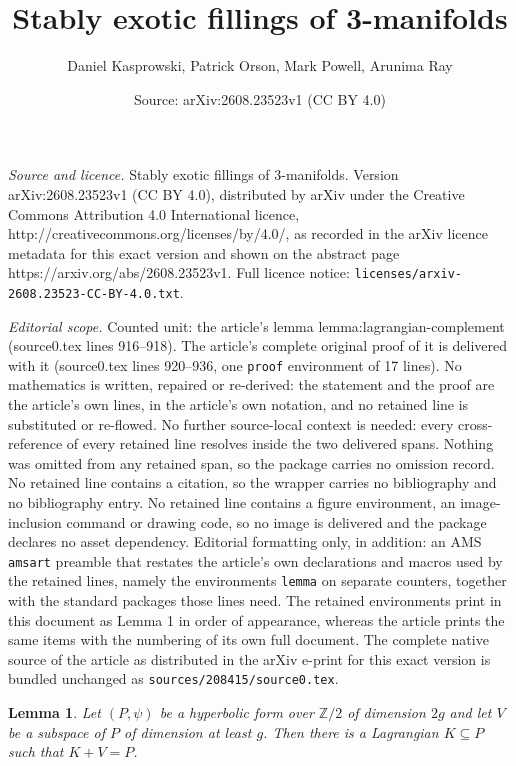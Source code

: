 \documentclass[10pt,a4paper]{amsart}
\title{Stably exotic fillings of 3-manifolds}
\author{Daniel Kasprowski, Patrick Orson, Mark Powell, Arunima Ray}
\date{Source: arXiv:2608.23523v1 (CC BY 4.0)}
\newtheorem{lemma}{Lemma}
\newcommand{\Z}{\mathbb{Z}}
\begin{document}
\maketitle

\noindent\emph{Source and licence.} Stably exotic fillings of 3-manifolds. Version arXiv:2608.23523v1 (CC BY 4.0), distributed by arXiv under the Creative Commons Attribution 4.0 International licence, http://creativecommons.org/licenses/by/4.0/, as recorded in the arXiv licence metadata for this exact version and shown on the abstract page https://arxiv.org/abs/2608.23523v1. Full licence notice: \texttt{licenses/arxiv-2608.23523-CC-BY-4.0.txt}.\par\smallskip

\noindent\textit{Editorial scope.} Counted unit: the article's lemma lemma:lagrangian-complement (source0.tex lines 916--918). The article's complete original proof of it is delivered with it (source0.tex lines 920--936, one \texttt{proof} environment of 17 lines). No mathematics is written, repaired or re-derived: the statement and the proof are the article's own lines, in the article's own notation, and no retained line is substituted or re-flowed.  No further source-local context is needed: every cross-reference of every retained line resolves inside the two delivered spans.  Nothing was omitted from any retained span, so the package carries no omission record.  No retained line contains a citation, so the wrapper carries no bibliography and no bibliography entry.  No retained line contains a figure environment, an image-inclusion command or drawing code, so no image is delivered and the package declares no asset dependency.  Editorial formatting only, in addition: an AMS \texttt{amsart} preamble that restates the article's own declarations and macros used by the retained lines, namely the environments \texttt{lemma} on separate counters, together with the standard packages those lines need.  The retained environments print in this document as Lemma 1 in order of appearance, whereas the article prints the same items with the numbering of its own full document.  The complete native source of the article as distributed in the arXiv e-print for this exact version is bundled unchanged as \texttt{sources/208415/source0.tex}.
\begin{lemma}\label{lemma:lagrangian-complement}
    Let $(P,\psi)$ be a hyperbolic form over $\Z/2$ of dimension $2g$ and let $V$ be a subspace of $P$ of dimension at least $g$. Then there is a Lagrangian $K \subseteq P$ such that $K +V = P$. 
\end{lemma}
\end{document}
